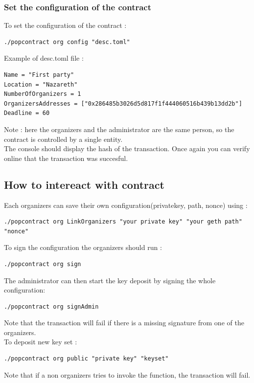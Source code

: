 \documentclass[11pt, a4paper, twoside, openright]{book} %
\begin{document}
\subsubsection*{Set the configuration of the contract}

To set the configuration of the contract :
\begin{lstlisting}
./popcontract org config "desc.toml"
\end{lstlisting}
Example of desc.toml file : 
\begin{lstlisting}
Name = "First party"
Location = "Nazareth"
NumberOfOrganizers = 1
OrganizersAddresses = ["0x286485b3026d5d817f1f444060516b439b13dd2b"]
Deadline = 60
\end{lstlisting}
Note : here the organizers and the administrator are the same person, so the contract is controlled by a single entity.\\
The console should display the hash of the transaction. Once again you can verify online that the transaction was succesful.

\subsection{How to intereact with contract}
Each organizers can save their own configuration(privatekey, path, nonce) using :  
\begin{lstlisting}
./popcontract org LinkOrganizers "your private key" "your geth path" "nonce"
\end{lstlisting}


To sign the configuration the organizers should run :
\begin{lstlisting}
./popcontract org sign 
\end{lstlisting}


The administrator can then start the key deposit by signing the whole configuration:
\begin{lstlisting}
./popcontract org signAdmin
\end{lstlisting}
Note that the transaction will fail if there is a missing signature from one of the organizers. \\

To deposit new key set :
\begin{lstlisting}
./popcontract org public "private key" "keyset"
\end{lstlisting}

Note that if a non organizers tries to invoke the function, the transaction will fail.
\end{document}

